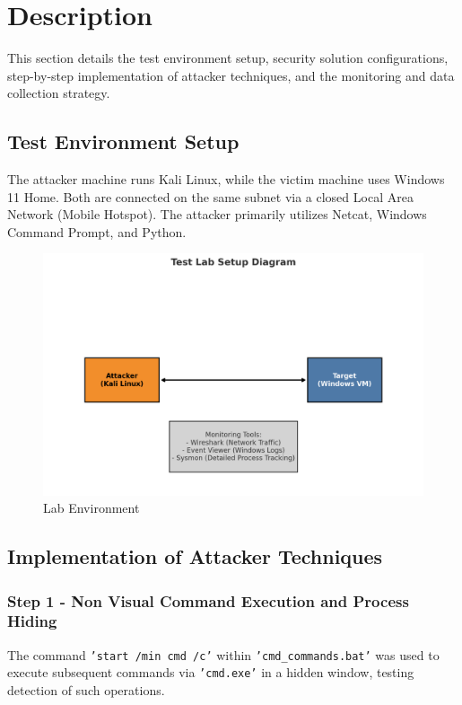 \documentclass[11pt]{article}
\begin{document}
	
	
	\section{Description}
	This section details the test environment setup, security solution configurations, step-by-step implementation of attacker techniques, and the monitoring and data collection strategy.
	
	\subsection{Test Environment Setup}
	The attacker machine runs Kali Linux, while the victim machine uses Windows 11 Home. Both are connected on the same subnet via a closed Local Area Network (Mobile Hotspot). The attacker primarily utilizes Netcat, Windows Command Prompt, and Python.
	\begin{figure}[H]
		\centering
		\includegraphics[width=1\linewidth]{Pictures/test_lab_env}
		\caption{Lab Environment}
		\label{fig:testlabenv}
	\end{figure}
	
	
	\subsection{Implementation of Attacker Techniques}
	\subsubsection{Step 1 - Non Visual Command Execution and Process Hiding}
	The command \texttt{'start /min cmd /c'} within \texttt{'cmd\_commands.bat'} was used to execute subsequent commands via \texttt{'cmd.exe'} in a hidden window, testing detection of such operations.
	
\end{document}
